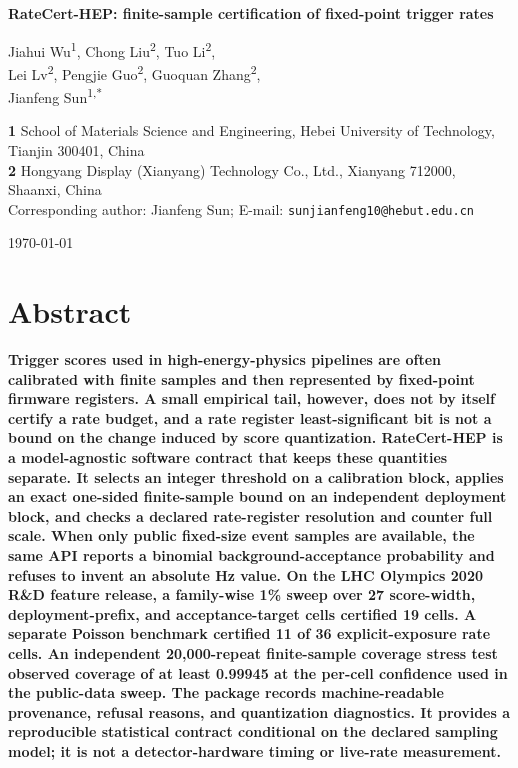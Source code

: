 \documentclass[submission, Phys]{SciPost}
\begin{document}
\begin{center}
{\Large \textbf{RateCert-HEP: finite-sample certification of fixed-point trigger rates}}\\
\end{center}

\begin{center}
Jiahui Wu\textsuperscript{1}, Chong Liu\textsuperscript{2}, Tuo Li\textsuperscript{2},\\
Lei Lv\textsuperscript{2}, Pengjie Guo\textsuperscript{2}, Guoquan Zhang\textsuperscript{2},\\
Jianfeng Sun\textsuperscript{1,*}
\end{center}
\begin{center}
{\bf 1} School of Materials Science and Engineering, Hebei University of
Technology, Tianjin 300401, China\\
{\bf 2} Hongyang Display (Xianyang) Technology Co., Ltd., Xianyang 712000,
Shaanxi, China\\
{\bf *} Corresponding author: Jianfeng Sun; E-mail:
\texttt{sunjianfeng10@hebut.edu.cn}
\end{center}
\begin{center}
\today
\end{center}

\section*{Abstract}
{\bf
Trigger scores used in high-energy-physics pipelines are often calibrated with
finite samples and then represented by fixed-point firmware registers.  A small
empirical tail, however, does not by itself certify a rate budget, and a rate
register least-significant bit is not a bound on the change induced by score
quantization.  RateCert-HEP is a model-agnostic software contract that keeps
these quantities separate.  It selects an integer threshold on a calibration
block, applies an exact one-sided finite-sample bound on an independent
deployment block, and checks a declared rate-register resolution and counter
full scale.  When only public fixed-size event samples are available, the same
API reports a binomial background-acceptance probability and refuses to invent
an absolute Hz value.  On the LHC Olympics 2020 R\&D feature release, a
  family-wise 1\% sweep over 27 score-width, deployment-prefix, and
  acceptance-target cells certified 19 cells.  A separate Poisson benchmark
  certified 11 of 36
explicit-exposure rate cells.  An independent 20,000-repeat finite-sample
coverage stress test observed coverage of at least 0.99945 at the per-cell
confidence used in the public-data sweep.  The package records
machine-readable provenance, refusal reasons, and quantization diagnostics.  It
provides a reproducible statistical contract conditional on the declared
sampling model; it is not a detector-hardware timing or live-rate measurement.
}
\end{document}
